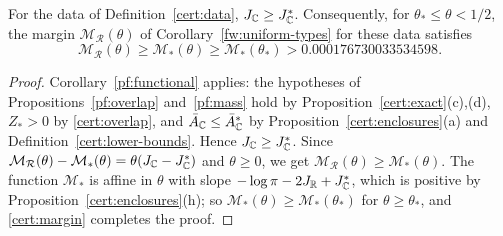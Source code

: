 \begin{lemma}\label{cert:lower-margin}
For the data of Definition~\ref{cert:data}, $J_\mathbb C\ge J_\mathbb C^*$.
Consequently, for $\theta_*\le\theta<1/2$, the margin $\mathcal
M_{\mathcal R}(\theta)$ of Corollary~\ref{fw:uniform-types} for these
data satisfies
\[
 \mathcal M_{\mathcal R}(\theta)\ge\mathcal M_*(\theta)\ge\mathcal
 M_*(\theta_*)>0.000176730033534598 .
\]
\end{lemma}

\begin{proof}
Corollary~\ref{pf:functional} applies: the hypotheses of
Propositions~\ref{pf:overlap} and~\ref{pf:mass} hold by
Proposition~\ref{cert:exact}(c),(d), $Z_*>0$ by \eqref{cert:overlap},
and $\bar A_\mathbb C\le\bar A_\mathbb C^*$ by Proposition~\ref{cert:enclosures}(a) and
Definition~\ref{cert:lower-bounds}. Hence $J_\mathbb C\ge
J_\mathbb C^*$. Since $\mathcal M_{\mathcal R}(\theta)-\mathcal
M_*(\theta)=\theta(J_\mathbb C-J_\mathbb C^*)$ and $\theta\ge0$, we get $\mathcal
M_{\mathcal R}(\theta)\ge\mathcal M_*(\theta)$. The function $\mathcal
M_*$ is affine in $\theta$ with slope $-\log\pi-2J_\mathbb R+J_\mathbb C^*$, which is
positive by Proposition~\ref{cert:enclosures}(h); so $\mathcal
M_*(\theta)\ge\mathcal M_*(\theta_*)$ for $\theta\ge\theta_*$, and
\eqref{cert:margin} completes the proof.
\end{proof}

